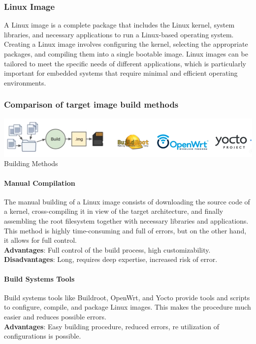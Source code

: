 \subsubsection{Linux Image} 

A Linux image is a complete package that includes the Linux kernel, system libraries, and necessary applications to run a Linux-based operating system. Creating a Linux image involves configuring the kernel, selecting the appropriate packages, and compiling them into a single bootable image. Linux images can be tailored to meet the specific needs of different applications, which is particularly important for embedded systems that require minimal and efficient operating environments.

\subsubsection{Comparison of target image build methods} 


    \includegraphics[width=1\linewidth]{Images/9_Linux_image/Building Method.png}
    \centering
    Building Methods
    \label{fig:enter-label} 
    \\
\raggedright

\paragraph{\textbf{Manual Compilation}}
The manual building of a Linux image consists of downloading the source code of a kernel, cross-compiling it in view of the target architecture, and finally assembling the root filesystem together with necessary libraries and applications. This method is highly time-consuming and full of errors, but on the other hand, it allows for full control.\\
\noindent
\textbf{Advantages}: Full control of the build process, high customizability. \\
\textbf{Disadvantages}: Long, requires deep expertise, increased risk of error.\\

\paragraph{\textbf{Build Systems Tools}}
Build systems tools like Buildroot, OpenWrt, and Yocto provide tools and scripts to configure, compile, and package Linux images. This makes the procedure much easier and reduces possible errors.\\
\noindent
\textbf{Advantages}: Easy building procedure, reduced errors, re utilization of configurations is possible.\\

